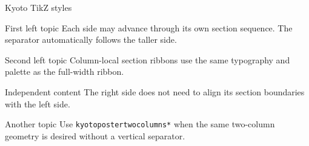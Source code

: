 \documentclass[final]{beamer}
\begin{document}
\begin{frame}[t]
\begin{kyotopostertwocolumns*}
    \begin{kyotoposterrightcolumn}
      \begin{block}{Kyoto TikZ styles}
        \centering
      \end{block}
    \end{kyotoposterrightcolumn}
  \end{kyotopostertwocolumns*}



  \begin{kyotopostertwocolumns}
    \begin{kyotoposterleftcolumn}

      \begin{block}{First left topic}
        Each side may advance through its own section sequence.  The
        separator automatically follows the taller side.
      \end{block}


      \begin{block}{Second left topic}
        Column-local section ribbons use the same typography and palette as
        the full-width ribbon.
      \end{block}
    \end{kyotoposterleftcolumn}

    \begin{kyotoposterrightcolumn}

      \begin{block}{Independent content}
        The right side does not need to align its section boundaries with
        the left side.
      \end{block}

      \vspace{1.3em}

      \begin{block}{Another topic}
        Use \texttt{kyotopostertwocolumns*} when the same two-column
        geometry is desired without a vertical separator.
      \end{block}
    \end{kyotoposterrightcolumn}
  \end{kyotopostertwocolumns}
\end{frame}
\end{document}
